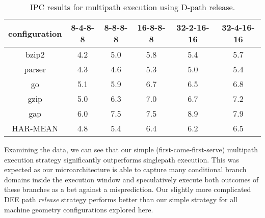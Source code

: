 \documentclass[10pt,dvips]{article}
\begin{document}
%
\begin{table}
\begin{center}
\caption{IPC results for multipath execution using D-path release.}
\label{tab:ipc3}
\begin{tabular}{|c|c|c|c|c|c|}
\hline 
configuration&
8-4-8-8&
8-8-8-8&
16-8-8-8&
32-2-16-16&
32-4-16-16\\
\hline 
\hline
bzip2&4.2&5.0&5.8&5.4&5.7\\
\hline 
parser&4.3&4.6&5.3&5.0&5.4\\
\hline 
go&5.1&5.9&6.7&6.5&6.8\\
\hline 
gzip&5.0&6.3&7.0&6.7&7.2\\
\hline 
gap&6.0&7.5&7.5&8.9&7.9\\
\hline 
\hline 
HAR-MEAN&4.8&5.4&6.4&6.2&6.5\\
\hline
\end{tabular}
\end{center}
\end{table}

%
Examining the data, we can see that our simple 
(first-come-first-serve)
multipath execution
strategy significantly outperforms singlepath execution.
This was expected as our microarchitecture is able to
capture many conditional branch domains inside the execution
window and speculatively execute both outcomes of these branches
as a bet against a misprediction.
Our slightly more complicated DEE path \textit{release} strategy
performs better than our simple strategy for all machine
geometry configurations explored here.
%
\end{document}
